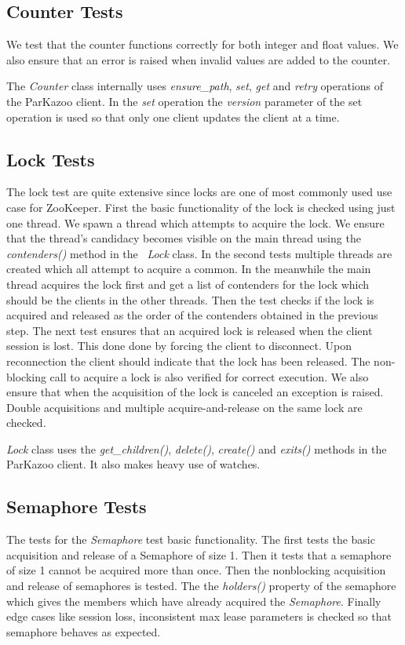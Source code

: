 \subsection{Counter Tests}

We test that the counter functions correctly for both integer and float values. We also ensure that an error is raised when invalid values are added to the counter.

The \textit{Counter} class internally uses \textit{ensure\_path}, \textit{set}, \textit{get} and \textit{retry} operations of the ParKazoo client. In the \textit{set} operation the \textit{version} parameter of the set operation is used so that only one client updates the client at a time.

\subsection{Lock Tests}
The lock test are quite extensive since locks are one of most commonly used use case for ZooKeeper. First the basic functionality of the lock is checked using just one thread. We spawn a thread which attempts to acquire the lock. We ensure that the thread's candidacy becomes visible on the main thread using the \textit{contenders()} method in the ~\textit{Lock} class. In the second tests multiple threads are created which all attempt to acquire a common. In the meanwhile the main thread acquires the lock first and get a list of contenders for the lock which should be the clients in the other threads. Then the test checks if the lock is acquired and released as the order of the contenders obtained in the previous step. The next test ensures that an acquired lock is released when the client session is lost. This done done by forcing the client to disconnect. Upon reconnection the client should indicate that the lock has been released. The non-blocking call to acquire a lock is also verified for correct execution. We also ensure that when the acquisition of the lock is canceled an exception is raised. Double acquisitions and multiple acquire-and-release on the same lock are checked.

\textit{Lock} class uses the \textit{get\_children()}, \textit{delete()}, \textit{create()} and \textit{exits()} methods in the ParKazoo client. It also makes heavy use of watches.

\subsection{Semaphore Tests}
The tests for the \textit{Semaphore} test basic functionality. The first tests the basic acquisition and release of a Semaphore of size 1. Then it tests that a semaphore of size 1 cannot be acquired more than once. Then the nonblocking acquisition and release of semaphores is tested. The the \textit{holders()} property of the semaphore which gives the members which have already acquired the \textit{Semaphore}. Finally edge cases like session loss, inconsistent max lease parameters is checked so that semaphore behaves as expected.
	
